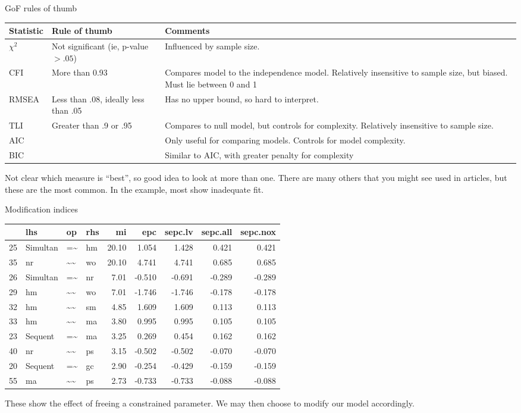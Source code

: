 \documentclass[10pt,ignorenonframetext,]{beamer}
\begin{document}
\begin{frame}{GoF rules of thumb}

\tiny

\begin{tabular}{llp{5.5cm}}
\hline
Statistic & Rule of thumb & Comments \\
\hline
$\chi^2$ & Not significant (ie, p-value $> .05$) & Influenced by sample size.\\ \addlinespace
CFI & More than 0.93 & Compares model to the independence model. Relatively insensitive to sample size, but biased. Must lie between 0 and 1\\ \addlinespace
RMSEA & Less than .08, ideally less than .05 & Has no upper bound, so hard to interpret.\\ \addlinespace
TLI & Greater than .9 or .95 & Compares to null model, but controls for complexity. Relatively insensitive to sample size.\\ \addlinespace
AIC & & Only useful for comparing models. Controls for model complexity.\\ \addlinespace
BIC & & Similar to AIC, with greater penalty for complexity \\
\hline
\end{tabular}

\normalsize
Not clear which measure is ``best'', so good idea to look at more than
one. There are many others that you might see used in articles, but
these are the most common. In the example, most show inadequate fit.

\end{frame}

\begin{frame}{Modification indices}

\footnotesize

\begin{longtable}[]{@{}llllrrrrr@{}}
\toprule
& lhs & op & rhs & mi & epc & sepc.lv & sepc.all &
sepc.nox\tabularnewline
\midrule
\endhead
25 & Simultan & =\textasciitilde{} & hm & 20.10 & 1.054 & 1.428 & 0.421
& 0.421\tabularnewline
35 & nr & \textasciitilde{}\textasciitilde{} & wo & 20.10 & 4.741 &
4.741 & 0.685 & 0.685\tabularnewline
26 & Simultan & =\textasciitilde{} & nr & 7.01 & -0.510 & -0.691 &
-0.289 & -0.289\tabularnewline
29 & hm & \textasciitilde{}\textasciitilde{} & wo & 7.01 & -1.746 &
-1.746 & -0.178 & -0.178\tabularnewline
32 & hm & \textasciitilde{}\textasciitilde{} & sm & 4.85 & 1.609 & 1.609
& 0.113 & 0.113\tabularnewline
33 & hm & \textasciitilde{}\textasciitilde{} & ma & 3.80 & 0.995 & 0.995
& 0.105 & 0.105\tabularnewline
23 & Sequent & =\textasciitilde{} & ma & 3.25 & 0.269 & 0.454 & 0.162 &
0.162\tabularnewline
40 & nr & \textasciitilde{}\textasciitilde{} & ps & 3.15 & -0.502 &
-0.502 & -0.070 & -0.070\tabularnewline
20 & Sequent & =\textasciitilde{} & gc & 2.90 & -0.254 & -0.429 & -0.159
& -0.159\tabularnewline
55 & ma & \textasciitilde{}\textasciitilde{} & ps & 2.73 & -0.733 &
-0.733 & -0.088 & -0.088\tabularnewline
\bottomrule
\end{longtable}

These show the effect of freeing a constrained parameter. We may then
choose to modify our model accordingly.

\end{frame}
\end{document}
